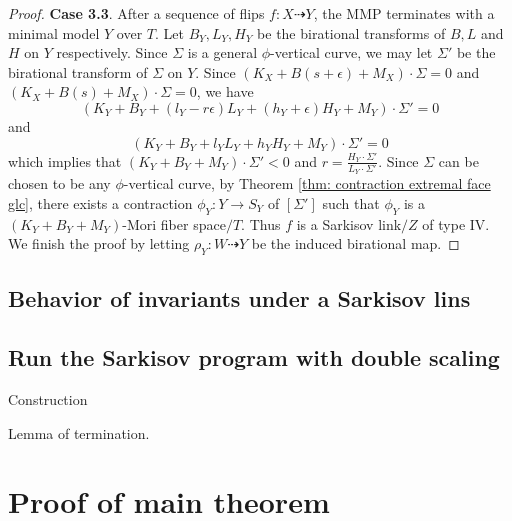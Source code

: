 \documentclass[11pt]{amsart}
\numberwithin{equation}{section}
\theoremstyle{definition}
\theoremstyle{definition}
\theoremstyle{definition}
\begin{document}
\begin{proof}
\noindent\textbf{Case 3.3}. After a sequence of flips $f: X\dashrightarrow Y$, the MMP terminates with a minimal model $Y$ over $T$. Let $B_Y,L_Y,H_Y$ be the birational transforms of $B,L$ and $H$ on $Y$ respectively. Since $\Sigma$ is a general $\phi$-vertical curve, we may let $\Sigma'$ be the birational transform of $\Sigma$ on $Y$. Since $(K_{X}+B(s+\epsilon)+M_X)\cdot\Sigma=0$ and $(K_{X}+B(s)+M_X)\cdot\Sigma=0$, we have
$$(K_Y+B_Y+(l_Y-r\epsilon)L_Y+(h_Y+\epsilon)H_Y+M_Y)\cdot\Sigma'=0$$
and
$$(K_Y+B_Y+l_YL_Y+h_YH_Y+M_Y)\cdot\Sigma'=0$$
which implies that $(K_Y+B_Y+M_Y)\cdot\Sigma'<0$ and $r=\frac{H_Y\cdot\Sigma'}{L_Y\cdot\Sigma'}$. Since $\Sigma$ can be chosen to be any $\phi$-vertical curve, by Theorem \ref{thm: contraction extremal face glc}, there exists a contraction $\phi_Y:Y\rightarrow S_Y$ of $[\Sigma']$ such that $\phi_Y$ is a $(K_Y+B_Y+M_Y)$-Mori fiber space$/T$. Thus $f$ is a Sarkisov link$/Z$ of type IV.  We finish the proof by letting $\rho_Y: W\dashrightarrow Y$ be the induced birational map.
\end{proof}

\subsection{Behavior of invariants under a Sarkisov lins}

\subsection{Run the Sarkisov program with double scaling}

Construction

Lemma of termination.

\section{Proof of main theorem}
\end{document}
